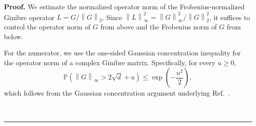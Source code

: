 \documentclass[superscriptaddress,amsmath,amssymb,aps,pra,letterpaper,tightenlines,notitlepages,12pt]{revtex4-2}
\newenvironment{proof}[1][Proof]{\noindent\textbf{#1.} }{\ \rule{0.5em}{0.5em}}
\begin{document}
\begin{proof}
    We estimate the normalized operator norm of the Frobenius-normalized Ginibre operator $L=G/\left\|G\right\|_2$.
    Since $\left\|L\right\|_\infty^2 =\left\|G\right\|_\infty^2/\left\|G\right\|_2^2$, it suffices to control the operator norm of $G$ from above and the Frobenius norm of $G$ from below.

    For the numerator, we use the one-sided Gaussian concentration inequality for the operator norm of a complex Ginibre matrix. 
    Specifically, for every $u\ge0$,
    \begin{equation}
        \mathbb{P}\!\left( \left\|G\right\|_\infty > 2\sqrt d+u \right)
        \le \exp\!\left(-\frac{u^2}{2}\right)   ,
    \end{equation}
    which follows from the Gaussian concentration argument underlying Ref.~\cite[Corollary~7.3.2]{vershynin2018HighDimensionalProbabilityIntroduction}.


\end{proof}
\end{document}
